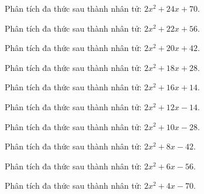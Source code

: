 \begin{bt}
	Phân tích đa thức sau thành nhân tử: $2 x^2 + 24 x + 70$.
\end{bt}
\begin{bt}
	Phân tích đa thức sau thành nhân tử: $2 x^2 + 22 x + 56$.
\end{bt}
\begin{bt}
	Phân tích đa thức sau thành nhân tử: $2 x^2 + 20 x + 42$.
\end{bt}
\begin{bt}
	Phân tích đa thức sau thành nhân tử: $2 x^2 + 18 x + 28$.
\end{bt}
\begin{bt}
	Phân tích đa thức sau thành nhân tử: $2 x^2 + 16 x + 14$.
\end{bt}
\begin{bt}
	Phân tích đa thức sau thành nhân tử: $2 x^2 + 12 x - 14$.
\end{bt}
\begin{bt}
	Phân tích đa thức sau thành nhân tử: $2 x^2 + 10 x - 28$.
\end{bt}
\begin{bt}
	Phân tích đa thức sau thành nhân tử: $2 x^2 + 8 x - 42$.
\end{bt}
\begin{bt}
	Phân tích đa thức sau thành nhân tử: $2 x^2 + 6 x - 56$.
\end{bt}
\begin{bt}
	Phân tích đa thức sau thành nhân tử: $2 x^2 + 4 x - 70$.
\end{bt}
